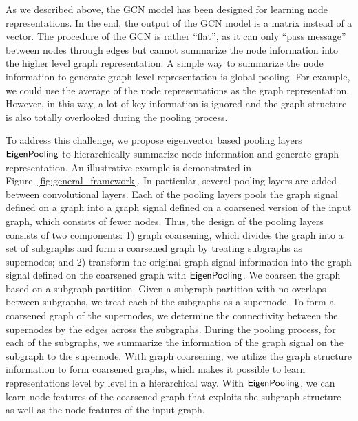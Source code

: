 \documentclass[sigconf]{acmart}
\newcommand{\pooling}{{\sf {EigenPooling}}}
\begin{document}
As we described above, the GCN model has been designed for learning node representations. In the end, the output of the GCN model is a matrix instead of a vector. The procedure of the GCN is rather ``flat'', as it can only ``pass message'' between nodes through edges but cannot summarize the node information into the higher level graph representation. A simple way to summarize the node information to generate graph level representation is global pooling. For example, we could use the average of the node representations as the graph representation. However, in this way, a lot of key information is ignored and the graph structure is also totally overlooked during the pooling process. 

To address this challenge, we propose eigenvector based pooling layers $\pooling$ to hierarchically summarize node information and generate graph representation. An illustrative example is demonstrated in Figure~\ref{fig:general_framework}. In particular, several pooling layers are added between convolutional layers. Each of the pooling layers pools the graph signal defined on a graph into a graph signal defined on a coarsened version of the input graph, which consists of fewer nodes. Thus, the design of the pooling layers consists of two components: 1) graph coarsening, which divides the graph into a set of subgraphs and form a coarsened graph by treating subgraphs as supernodes; and 2) transform the original graph signal information into the graph signal defined on the coarsened graph with $\pooling$. We coarsen the graph based on a subgraph partition. Given a subgraph partition with no overlaps between subgraphs, we treat each of the subgraphs as a supernode. To form a coarsened graph of the supernodes, we determine the connectivity between the supernodes by the edges across the subgraphs. During the pooling process, for each of the subgraphs, we summarize the information of the graph signal on the subgraph to the supernode. With graph coarsening, we utilize the graph structure information to form coarsened graphs, which makes it possible to learn representations level by level in a hierarchical way. With $\pooling$, we can learn node features of the coarsened graph that exploits the subgraph structure as well as the node features of the input graph.
\end{document}
